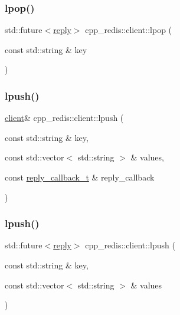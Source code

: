 \mbox{\label{classcpp__redis_1_1client_ab6ebbc7b2e6f43f2b5607a4b5471694e}} 
\subsubsection{\texorpdfstring{lpop()}{lpop()}\hspace{0.1cm}{\footnotesize\ttfamily [2/2]}}
{\footnotesize\ttfamily std\+::future$<$\hyperlink{classcpp__redis_1_1reply}{reply}$>$ cpp\+\_\+redis\+::client\+::lpop (\begin{DoxyParamCaption}\item[{const std\+::string \&}]{key }\end{DoxyParamCaption})}

\mbox{\label{classcpp__redis_1_1client_a0dd04ea38709dd51ae5f39de62d01c70}} 
\subsubsection{\texorpdfstring{lpush()}{lpush()}\hspace{0.1cm}{\footnotesize\ttfamily [1/2]}}
{\footnotesize\ttfamily \hyperlink{classcpp__redis_1_1client}{client}\& cpp\+\_\+redis\+::client\+::lpush (\begin{DoxyParamCaption}\item[{const std\+::string \&}]{key,  }\item[{const std\+::vector$<$ std\+::string $>$ \&}]{values,  }\item[{const \hyperlink{classcpp__redis_1_1client_a061a1140d36d2eaeda82b09a0bb3f9f2}{reply\+\_\+callback\+\_\+t} \&}]{reply\+\_\+callback }\end{DoxyParamCaption})}

\mbox{\label{classcpp__redis_1_1client_ac5859a6b63200a4a79574187a7155feb}} 
\subsubsection{\texorpdfstring{lpush()}{lpush()}\hspace{0.1cm}{\footnotesize\ttfamily [2/2]}}
{\footnotesize\ttfamily std\+::future$<$\hyperlink{classcpp__redis_1_1reply}{reply}$>$ cpp\+\_\+redis\+::client\+::lpush (\begin{DoxyParamCaption}\item[{const std\+::string \&}]{key,  }\item[{const std\+::vector$<$ std\+::string $>$ \&}]{values }\end{DoxyParamCaption})}

